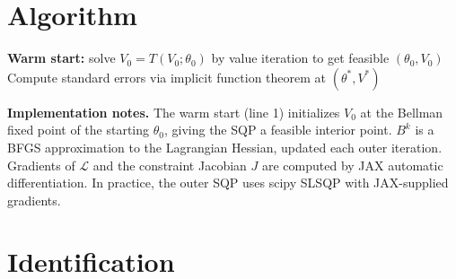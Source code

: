 \documentclass[10pt]{article}
\begin{document}
\section{Algorithm}

\begin{algorithm}[h!]
\DontPrintSemicolon
\caption{MPEC via SQP \citep{suJudd2012}}
\label{alg:mpec}
\BlankLine
\textbf{Warm start:} solve $V_0 = T(V_0;\theta_0)$ by value iteration to get feasible $(\theta_0, V_0)$\;
\BlankLine
{}
\BlankLine
Compute standard errors via implicit function theorem at $(\theta^*, V^*)$\;
\end{algorithm}
\FloatBarrier

\noindent\textbf{Implementation notes.}
The warm start (line 1) initializes $V_0$ at the Bellman fixed point of the starting $\theta_0$, giving the SQP a feasible interior point.
$B^k$ is a BFGS approximation to the Lagrangian Hessian, updated each outer iteration.
Gradients of $\mathcal{L}$ and the constraint Jacobian $J$ are computed by JAX automatic differentiation.
In practice, the outer SQP uses scipy SLSQP with JAX-supplied gradients.

\section{Identification}
\end{document}

